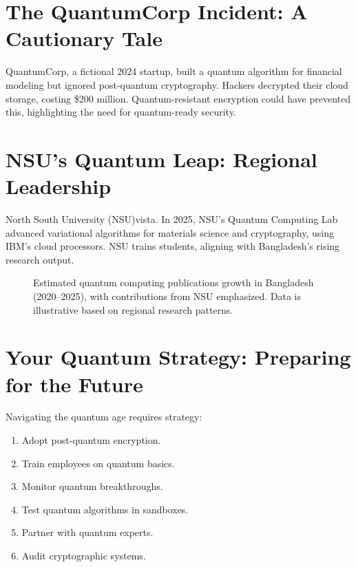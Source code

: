 \documentclass[a4paper,10pt,twocolumn]{memoir}
\begin{document}
\section*{The QuantumCorp Incident: A Cautionary Tale}
QuantumCorp, a fictional 2024 startup, built a quantum algorithm for financial modeling but ignored post-quantum cryptography. Hackers decrypted their cloud storage, costing \$200 million. Quantum-resistant encryption could have prevented this, highlighting the need for quantum-ready security.


\section*{NSU's Quantum Leap: Regional Leadership}
North South University (NSU)vista. In 2025, NSU's Quantum Computing Lab advanced variational algorithms for materials science and cryptography, using IBM's cloud processors. NSU trains students, aligning with Bangladesh's rising research output.




\begin{figure}[h]
\centering
{}
\caption{Estimated quantum computing publications growth in Bangladesh (2020–2025), with contributions from NSU emphasized. Data is illustrative based on regional research patterns.}
\label{fig:quantumgrowth}
\end{figure}


\section*{Your Quantum Strategy: Preparing for the Future}
Navigating the quantum age requires strategy:
\begin{enumerate}
    \item Adopt post-quantum encryption.
    \item Train employees on quantum basics.
    \item Monitor quantum breakthroughs.
    \item Test quantum algorithms in sandboxes.
    \item Partner with quantum experts.
    \item Audit cryptographic systems.
\end{enumerate}
\end{document}
